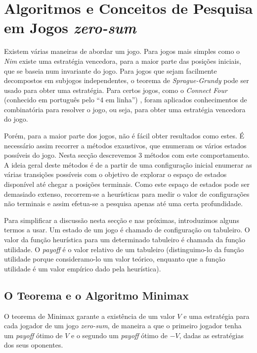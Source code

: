 \documentclass[12pt,a4paper,oneside]{article}
\begin{document}

\section{Algoritmos e Conceitos de Pesquisa em Jogos \textit{zero-sum}}
\label{sec:algconc}

Existem várias maneiras de abordar um jogo. Para jogos mais simples
como o \textit{Nim} existe uma estratégia vencedora, para a maior
parte das posições iniciais, que se baseia num invariante do
jogo. Para jogos que sejam facilmente decompostos em subjogos
independentes, o teorema de \textit{Sprague-Grundy} pode ser usado
para obter uma estratégia. Para certos jogos, como o \textit{Connect
  Four} (conhecido em português pelo ``4 em linha'')
\cite{Allis:1988}, foram aplicados conhecimentos de combinatória para
resolver o jogo, ou seja, para obter uma estratégia vencedora do
jogo.

Porém, para a maior parte dos jogos, não é fácil obter resultados como
estes. É necessário assim recorrer a métodos exaustivos, que enumeram
os vários estados possíveis do jogo. Nesta secção descrevemos 3
métodos com este comportamento. A ideia geral deste métodos é de a
partir de uma configuração inicial enumerar as várias transições
possíveis com o objetivo de explorar o espaço de estados disponível
até chegar a posições terminais. Como este espaço de estados pode ser
demasiado extenso, recorrem-se a heurísticas para medir o valor de
configurações não terminais e assim efetua-se a pesquisa apenas até
uma certa profundidade.

Para simplificar a discussão nesta secção e nas próximas, introduzimos
alguns termos a usar. Um estado de um jogo é chamado de configuração
ou tabuleiro. O valor da função heurística para um determinado
tabuleiro é chamada da função utilidade. O \textit{payoff} é o valor
relativo de um tabuleiro (distinguimo-lo da função utilidade porque
consideramo-lo um valor teórico, enquanto que a função utilidade é um
valor empírico dado pela heurística).

\subsection{O Teorema e o Algoritmo Minimax}

O teorema de Minimax garante a existência de um valor $V$ e uma estratégia para cada jogador de um jogo \emph{zero-sum}, de maneira a que o primeiro jogador tenha um \emph{payoff} ótimo de $V$ e o segundo um \emph{payoff} ótimo de $-V$, dadas as estratégias dos seus oponentes.
\end{document}
